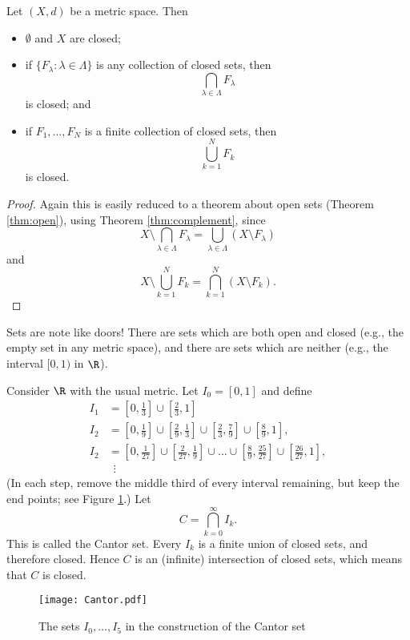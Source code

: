 \np

\begin{theorem}
Let $(X,d)$ be a metric space. Then
\begin{itemize}
\item $\emptyset$ and $X$ are closed;
\item if $\{F_\lambda: \lambda \in \Lambda\}$ is any collection
of closed sets, then
\[
\bigcap_{\lambda \in \Lambda} F_\lambda
\]
is closed; and
\item if $F_1, \ldots, F_N$ is a finite collection of
closed sets, then
\[
\bigcup_{k = 1}^N F_k
\]
is closed.
\end{itemize}
\end{theorem}

\begin{proof}
Again this is easily reduced to a theorem about open sets (Theorem \ref{thm:open}), using Theorem \ref{thm:complement}, since 
$$
X\setminus \bigcap_{\lambda \in \Lambda} F_\lambda = \bigcup_{\lambda \in \Lambda} (X\setminus F_\lambda)
$$
and 
$$
X\setminus \bigcup_{k = 1}^N F_k = \bigcap_{k = 1}^N (X\setminus F_k).
$$
\end{proof}

\bis

\begin{remark}
Sets are note like doors! There are sets
which are both open and closed (e.g., the empty set in any metric space), and there
are sets which are neither (e.g., the interval $[0,1)$ in $\R$).
\end{remark}

\np

\begin{example}[Cantor]\label{C:set}
Consider $\R$ with the usual metric. Let $I_0 = [0,1]$ and define
\begin{align*}
I_1 & = \textstyle [0,\frac{1}{3}] \cup [\frac{2}{3},1] \\
I_2 & = \textstyle [0,\frac{1}{9}] \cup [\frac{2}{9},\frac{1}{3}] \cup [\frac{2}{3},\frac{7}{9}] \cup [\frac{8}{9},1], \\
I_2 & = \textstyle [0,\frac{1}{27}] \cup [\frac{2}{27},\frac{1}{9}] \cup \ldots \cup  [\frac{8}{9},\frac{25}{27}] \cup [\frac{26}{27},1], \\
& \hspace{6pt} \vdots
\end{align*}
(In each step, remove the middle third of every interval remaining, but keep the end points; see Figure \ref{fig:Cantor}.)
Let
\[
C = \bigcap_{k = 0}^\infty I_k.
\]
This is called the Cantor set.  Every $I_k$ is a finite union of closed sets, and therefore closed.
Hence $C$ is an (infinite) intersection of closed sets, which means that $C$ is closed.
\begin{figure}[ht]
\begin{center}
\texttt{[image: Cantor.pdf]}
\end{center}
\caption{The sets $I_0,\ldots,I_5$ in the construction of the Cantor set}
\label{fig:Cantor}
\end{figure}
\end{example}

